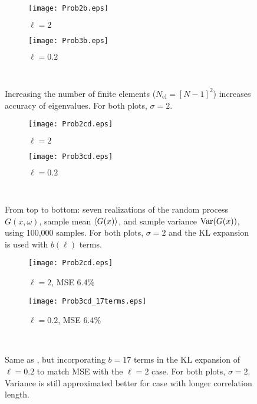\documentclass[11pt]{article}
\begin{document}
\begin{figure}[p]
\centering
\begin{subfigure}{0.49\textwidth}
\texttt{[image: Prob2b.eps]}
\caption{$\ell=2$}
\end{subfigure}
\begin{subfigure}{0.49\textwidth}
\texttt{[image: Prob3b.eps]}
\caption{$\ell=0.2$}
\end{subfigure}
\\[0.2cm]
\caption{Increasing the number of finite elements ($N_\text{el}=[N-1]^2$) increases accuracy of eigenvalues. For both plots, $\sigma=2$.}
\label{fig:error_reduction}
\end{figure}

\begin{figure}[p]
\centering
\begin{subfigure}{0.49\textwidth}
\texttt{[image: Prob2cd.eps]}
\caption{$\ell=2$}
\end{subfigure}
\begin{subfigure}{0.49\textwidth}
\texttt{[image: Prob3cd.eps]}
\caption{$\ell=0.2$}
\end{subfigure}
\\[0.2cm]
\caption{From top to bottom: seven realizations of the random process $G(x,\omega)$, sample mean $\left\langle G(x) \right\rangle$, and sample variance $\operatorname{Var}(G(x))$, using 100,000 samples. For both plots, $\sigma=2$ and the KL expansion is used with $b(\ell)$ terms.}
\label{fig:realizations}
\end{figure}

\begin{figure}[p]
\centering
\begin{subfigure}{0.49\textwidth}
\texttt{[image: Prob2cd.eps]}
\caption{$\ell=2$, MSE 6.4\%}
\end{subfigure}
\begin{subfigure}{0.49\textwidth}
\texttt{[image: Prob3cd\_17terms.eps]}
\caption{$\ell=0.2$, MSE 6.4\%}
\end{subfigure}
\\[0.2cm]
\caption{Same as , but incorporating $b=17$ terms in the KL expansion of $\ell=0.2$ to match MSE with the $\ell=2$ case. For both plots, $\sigma=2$. Variance is still approximated better for case with longer correlation length.}
\label{fig:realizations_moreterms}
\end{figure}

\end{document}
